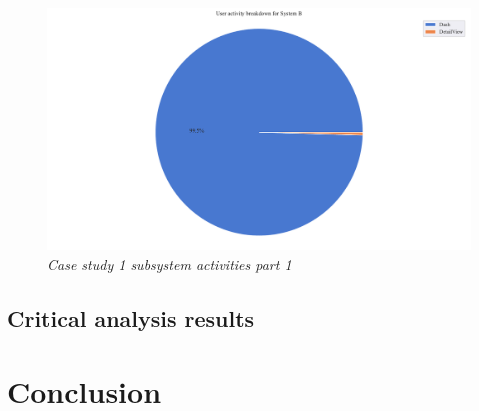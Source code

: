\begin{figure}[!htb]
	\centering %
	\includegraphics[width=0.95\linewidth]{img/ch3/analysis/case_B_breakdown.pdf}
	\caption[Case study 1 subsystem activities part 1]
	{\textit{Case study 1 subsystem activities part 1}}\label{fig:ch3_caseBBreakdown}
\end{figure}

\clearpage

\subsection{Critical analysis results}

\section{Conclusion}